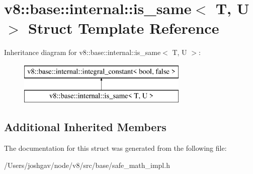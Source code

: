 \hypertarget{structv8_1_1base_1_1internal_1_1is__same}{}\section{v8\+:\+:base\+:\+:internal\+:\+:is\+\_\+same$<$ T, U $>$ Struct Template Reference}
\label{structv8_1_1base_1_1internal_1_1is__same}
Inheritance diagram for v8\+:\+:base\+:\+:internal\+:\+:is\+\_\+same$<$ T, U $>$\+:\begin{figure}[H]
\begin{center}
\leavevmode
\includegraphics[height=2.000000cm]{structv8_1_1base_1_1internal_1_1is__same}
\end{center}
\end{figure}
\subsection*{Additional Inherited Members}


The documentation for this struct was generated from the following file\+:\begin{DoxyCompactItemize}
\item 
/\+Users/joshgav/node/v8/src/base/safe\+\_\+math\+\_\+impl.\+h\end{DoxyCompactItemize}
